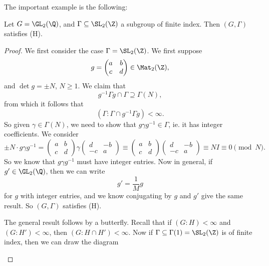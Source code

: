\documentclass[a4paper]{article}
\begin{document}
The important example is the following:
\begin{thm}
  Let $G = \GL_2(\Q)$, and $\Gamma \subseteq \SL_2(\Z)$ a subgroup of finite index. Then $(G, \Gamma)$ satisfies (H).
\end{thm}

\begin{proof}
  We first consider the case $\Gamma = \SL_2(\Z)$. We first suppose
  \[
    g =
    \begin{pmatrix}
      a & b\\
      c & d
    \end{pmatrix}
    \in \Mat_2(\Z),
  \]
  and $\det g = \pm N$, $N \geq 1$. We claim that
    \[
    g^{-1}\Gamma g \cap \Gamma \supseteq \Gamma(N),
  \]
  from which it follows that
  \[
    (\Gamma : \Gamma \cap g^{-1} \Gamma g) < \infty.
  \]
  So given $\gamma \in \Gamma(N)$, we need to show that $g \gamma g^{-1} \in \Gamma$, ie. it has integer coefficients. We consider
  \[
    \pm N \cdot g \gamma g^{-1} =
    \begin{pmatrix}
      a & b\\
      c & d
    \end{pmatrix} \gamma
    \begin{pmatrix}
      d & -b\\
      -c& a
    \end{pmatrix}
    \equiv
    \begin{pmatrix}
      a & b\\
      c & d
    \end{pmatrix}
    \begin{pmatrix}
      d & -b\\
      -c & a
    \end{pmatrix} \equiv NI \equiv 0\pmod N.
  \]
  So we know that $g \gamma g^{-1}$ must have integer entries. Now in general, if $g' \in \GL_2(\Q)$, then we can write
  \[
    g' = \frac{1}{M} g
  \]
  for $g$ with integer entries, and we know conjugating by $g$ and $g'$ give the same result. So $(G, \Gamma)$ satisfies (H).

  \separator

  The general result follows by a butterfly. Recall that if $(G: H) < \infty$ and $(G: H') < \infty$, then $(G: H \cap H') < \infty$. Now if $\Gamma \subseteq \Gamma(1) = \SL_2(\Z)$ is of finite index, then we can draw the diagram
  \begin{center}
\end{center}
\end{proof}
\end{document}
